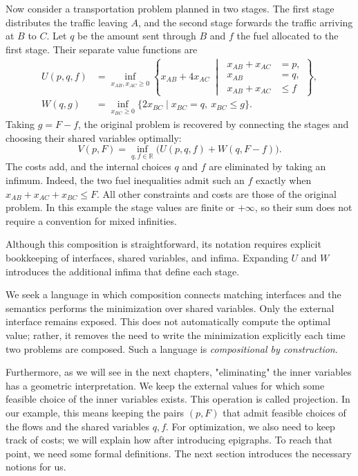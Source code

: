 Now consider a transportation problem planned in two stages. The first stage distributes the traffic
leaving $A$, and the second stage forwards the traffic arriving at $B$ to $C$.
Let $q$ be the amount sent through $B$ and $f$ the fuel allocated to the
first stage. Their separate value functions are
\[
\begin{aligned}
U(p,q,f)&=\inf_{x_{AB},x_{AC}\ge0}
\left\{x_{AB}+4x_{AC}\;\middle|\;
\begin{aligned}
x_{AB}+x_{AC}&=p,\\
x_{AB}&=q,\\
x_{AB}+x_{AC}&\le f
\end{aligned}\right\},\\[1ex]
W(q,g)&=\inf_{x_{BC}\ge0}
\{2x_{BC}\mid x_{BC}=q,\ x_{BC}\le g\}.
\end{aligned}
\]
Taking $g=F-f$, the original problem is recovered by connecting the stages
and choosing their shared variables optimally:
\[
V(p,F)=\inf_{q,f\in\mathbb{R}}
\bigl(U(p,q,f)+W(q,F-f)\bigr).
\]
The costs add, and the internal choices $q$ and $f$ are eliminated by taking
an infimum. Indeed, the two fuel inequalities admit such an $f$ exactly when
$x_{AB}+x_{AC}+x_{BC}\le F$. All other constraints and costs are those of
the original problem. In this example the stage values are finite or
$+\infty$, so their sum does not require a convention for mixed infinities.

Although this composition is straightforward, its notation requires explicit
bookkeeping of interfaces, shared variables, and infima. Expanding $U$ and $W$
introduces the additional infima that define each stage.

We seek a language in which composition connects matching interfaces and the
semantics performs the minimization over shared variables. Only the external
interface remains exposed. This does not automatically compute the optimal
value; rather, it removes the need to write the minimization explicitly each
time two problems are composed. Such a language is
\textit{compositional by construction}.

Furthermore, as we will see in the next chapters, "eliminating" the inner
variables has a geometric interpretation. We keep the external values for which
some feasible choice of the inner variables exists. This operation is called
projection. In our example, this means keeping the pairs $(p,F)$ that admit
feasible choices of the flows and the shared variables $q,f$. For optimization,
we also need to keep track of costs; we will explain how after introducing epigraphs.
To reach that point, we need some formal definitions. The next section introduces
the necessary notions for us.

